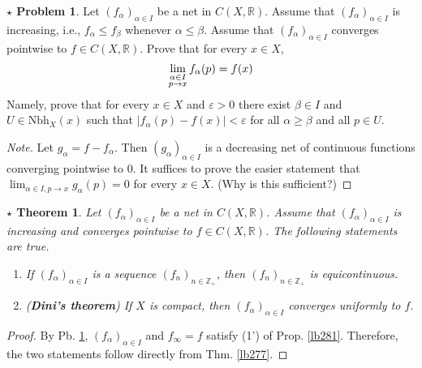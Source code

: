 \documentclass[12pt,b5paper,notitlepage]{article}
\theoremstyle{definition}
\newtheorem{sprob}[prob]{\color{red}$\star$ Problem}
\theoremstyle{plain}
\newtheorem{sthm}[df]{$\star$ Theorem}
\newcommand{\Zbb}{\mathbb Z}
\newcommand{\Rbb}{\mathbb R}
\newcommand{\dps}{\displaystyle}
\newcommand{\Nbh}{\mathrm{Nbh}}
\newcommand{\eps}{\varepsilon}
\numberwithin{equation}{section}
\begin{document}
\begin{sprob}\label{lb285}
Let $(f_\alpha)_{\alpha\in I}$ be a net in $C(X,\Rbb)$. Assume that $(f_\alpha)_{\alpha\in I}$ is increasing, i.e., $f_\alpha\leq f_\beta$ whenever $\alpha\leq\beta$. Assume that $(f_\alpha)_{\alpha\in I}$ converges pointwise to $f\in C(X,\Rbb)$. Prove that for every $x\in X$,
\begin{align}
\lim_{
\begin{subarray}{c}
\alpha\in I\\
p\rightarrow x
\end{subarray}
}
f_\alpha(p)=f(x)
\end{align}
Namely, prove that for every $x\in X$ and $\eps>0$ there exist $\beta\in I$ and $U\in\Nbh_X(x)$ such that $|f_\alpha(p)-f(x)|<\eps$ for all $\alpha\geq\beta$ and all $p\in U$.
\end{sprob}

\begin{proof}[Note]
Let $g_\alpha=f-f_\alpha$. Then $(g_\alpha)_{\alpha\in I}$ is a decreasing net of continuous functions converging pointwise to $0$. It suffices to prove the easier statement that $\dps\lim_{\alpha\in I,p\rightarrow x}g_\alpha(p)=0$ for every $x\in X$. (Why is this sufficient?)
\end{proof}

\begin{sthm}\label{lb286}
Let $(f_\alpha)_{\alpha\in I}$ be a net in $C(X,\Rbb)$. Assume that $(f_\alpha)_{\alpha\in I}$ is increasing and converges pointwise to $f\in C(X,\Rbb)$. The following statements are true.
\begin{enumerate}
\item If $(f_\alpha)_{\alpha\in I}$ is a sequence $(f_n)_{n\in\Zbb_+}$, then $(f_n)_{n\in\Zbb_+}$ is equicontinuous.
\item (\textbf{Dini's theorem})  If $X$ is compact, then $(f_\alpha)_{\alpha\in I}$ converges uniformly to $f$.
\end{enumerate}
\end{sthm}


\begin{proof}
By Pb. \ref{lb285}, $(f_\alpha)_{\alpha\in I}$ and $f_\infty=f$ satisfy (1') of Prop. \ref{lb281}. Therefore, the two statements follow directly from Thm. \ref{lb277}.
\end{proof}
\end{document}

